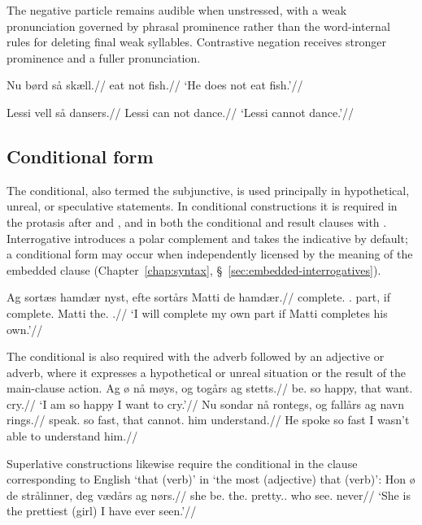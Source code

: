 The negative particle remains audible when unstressed, with a weak pronunciation governed by phrasal prominence rather than the word-internal rules for deleting final weak syllables. Contrastive negation receives stronger prominence and a fuller pronunciation.

\pex
\begingl
\gla Nu børd så skæll.//
\glb \Third{}\Sg{} eat not fish.//
\glft `He does not eat fish.'//
\endgl
\xe

\pex
\begingl
\gla Lessi vell så dansers.//
\glb Lessi can not dance.\Inf{}//
\glft `Lessi cannot dance.'//
\endgl
\xe


\subsection{Conditional form}
\label{sec:conditional-mood}

The conditional, also termed the subjunctive, is used principally in hypothetical, unreal, or speculative statements. In conditional constructions it is required in the protasis after  and , and in both the conditional and result clauses with . Interrogative  introduces a polar complement and takes the indicative by default; a conditional form may occur when independently licensed by the meaning of the embedded clause (Chapter~\ref{chap:syntax}, \S~\ref{sec:embedded-interrogatives}).

\pex
\begingl
\gla Ag sortæs hamdær nyst, efte sortårs Matti de hamdær.//
\glb \First{}\Sg{} complete.\Fut{} \Refl{}.\F{} part, if complete.\Cond{} Matti the.\F{} \Refl{}.\F{}//
\glft `I will complete my own part if Matti completes his own.'//
\endgl
\xe

The conditional is also required with the adverb  followed by an adjective or adverb, where it expresses a hypothetical or unreal situation or the result of the main-clause action.
\pex
\begingl
\gla Ag ø nå møys, og togårs ag stetts.//
\glb \First{}\Sg{} be.\Pres{} so happy, that want.\Cond{} \First{}\Sg{} cry.\Inf{}//
\glft `I am so happy I want to cry.'//
\endgl
\xe
\pex
\begingl
\gla Nu sondar nå rontegs, og fallårs ag navn rings.//
\glb \Third{}\Sg{} speak.\Pst{} so fast, that cannot.\Cond{} \First{}\Sg{} him understand.\Inf{}//
\glft He spoke so fast I wasn't able to understand him.//
\endgl
\xe

Superlative constructions likewise require the conditional in the clause corresponding to English `that (verb)' in `the most (adjective) that (verb)':
\pex
\begingl
\gla Hon ø de strålinner, deg vædårs ag nørs.//
\glb she be.\Pres{} the.\F{} pretty.\Comp{}.\F{} who see.\Cond{} \First{}\Sg{} never//
\glft `She is the prettiest (girl) I have ever seen.'//
\endgl
\xe

